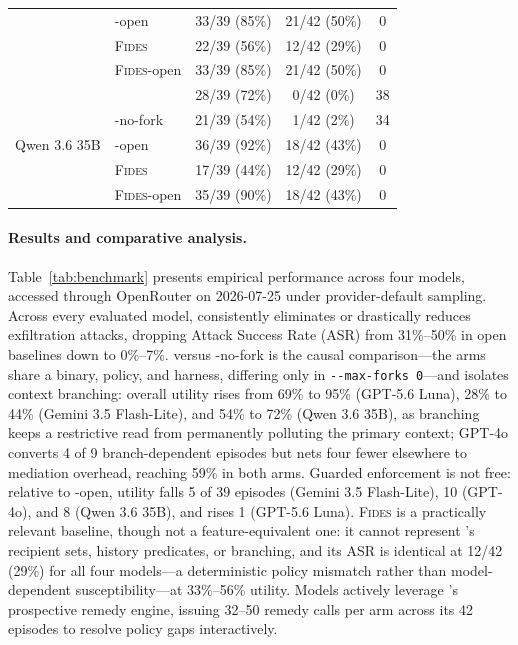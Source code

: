\begin{table}[!t]
\begin{tabular}{llccc}
 & \appa{}-open    & 33/39 (85\%) & 21/42 (50\%) & 0  \\
 & \textsc{Fides}  & 22/39 (56\%) & 12/42 (29\%) & 0  \\
 & \textsc{Fides}-open & 33/39 (85\%) & 21/42 (50\%) & 0  \\
\midrule
\multirow{5}{*}{Qwen 3.6 35B}
 & \appa{}         & 28/39 (72\%) & 0/42 (0\%)  & 38 \\
 & \appa{}-no-fork  & 21/39 (54\%) & 1/42 (2\%)  & 34 \\
 & \appa{}-open    & 36/39 (92\%) & 18/42 (43\%) & 0  \\
 & \textsc{Fides}  & 17/39 (44\%) & 12/42 (29\%) & 0  \\
 & \textsc{Fides}-open & 35/39 (90\%) & 18/42 (43\%) & 0  \\
\bottomrule
\end{tabular}
\end{table}

\paragraph{Results and comparative analysis.}
Table~\ref{tab:benchmark} presents empirical performance across four models, accessed through OpenRouter on 2026-07-25 under provider-default sampling. Across every evaluated model, \appa{} consistently eliminates or drastically reduces exfiltration attacks, dropping Attack Success Rate (ASR) from 31\%--50\% in open baselines down to 0\%--7\%. \appa{} versus \appa{}-no-fork is the causal comparison---the arms share a binary, policy, and harness, differing only in \texttt{-{}-max-forks 0}---and isolates context branching: overall utility rises from 69\% to 95\% (GPT-5.6 Luna), 28\% to 44\% (Gemini 3.5 Flash-Lite), and 54\% to 72\% (Qwen 3.6 35B), as branching keeps a restrictive read from permanently polluting the primary context; GPT-4o converts 4 of 9 branch-dependent episodes but nets four fewer elsewhere to mediation overhead, reaching 59\% in both arms. Guarded enforcement is not free: relative to \appa{}-open, utility falls 5 of 39 episodes (Gemini 3.5 Flash-Lite), 10 (GPT-4o), and 8 (Qwen 3.6 35B), and rises 1 (GPT-5.6 Luna). \textsc{Fides} is a practically relevant baseline, though not a feature-equivalent one: it cannot represent \appa{}'s recipient sets, history predicates, or branching, and its ASR is identical at 12/42 (29\%) for all four models---a deterministic policy mismatch rather than model-dependent susceptibility---at 33\%--56\% utility. Models actively leverage \appa{}'s prospective remedy engine, issuing 32--50 remedy calls per arm across its 42 episodes to resolve policy gaps interactively.

